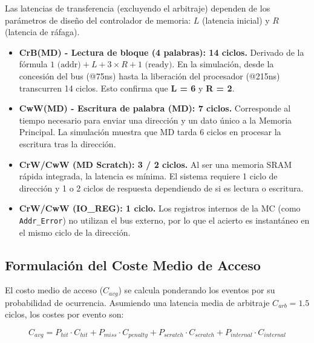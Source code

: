 \documentclass[12pt,a4paper]{article}
\begin{document}
Las latencias de transferencia (excluyendo el arbitraje) dependen de los parámetros de diseño del controlador de memoria: $L$ (latencia inicial) y $R$ (latencia de ráfaga).

\begin{itemize}
    \item \textbf{CrB(MD) - Lectura de bloque (4 palabras): 14 ciclos.}
    Derivado de la fórmula $1 \text{ (addr)} + L + 3 \times R + 1 \text{ (ready)}$. En la simulación, desde la concesión del bus (@75ns) hasta la liberación del procesador (@215ns) transcurren 14 ciclos. Esto confirma que \textbf{L = 6} y \textbf{R = 2}.
    
    \item \textbf{CwW(MD) - Escritura de palabra (MD): 7 ciclos.}
    Corresponde al tiempo necesario para enviar una dirección y un dato único a la Memoria Principal. La simulación muestra que MD tarda 6 ciclos en procesar la escritura tras la dirección.
    
    \item \textbf{CrW/CwW (MD Scratch): 3 / 2 ciclos.}
    Al ser una memoria SRAM rápida integrada, la latencia es mínima. El sistema requiere 1 ciclo de dirección y 1 o 2 ciclos de respuesta dependiendo de si es lectura o escritura.
    
    \item \textbf{CrW/CwW (IO\_REG): 1 ciclo.}
    Los registros internos de la MC (como \texttt{Addr\_Error}) no utilizan el bus externo, por lo que el acierto es instantáneo en el mismo ciclo de la dirección.
\end{itemize}

\subsection{Formulación del Coste Medio de Acceso}

El costo medio de acceso ($C_{avg}$) se calcula ponderando los eventos por su probabilidad de ocurrencia. Asumiendo una latencia media de arbitraje $C_{arb} = 1.5$ ciclos, los costes por evento son:

\begin{equation}
    C_{avg} = P_{hit} \cdot C_{hit} + P_{miss} \cdot C_{penalty} + P_{scratch} \cdot C_{scratch} + P_{internal} \cdot C_{internal}
\end{equation}
\end{document}

